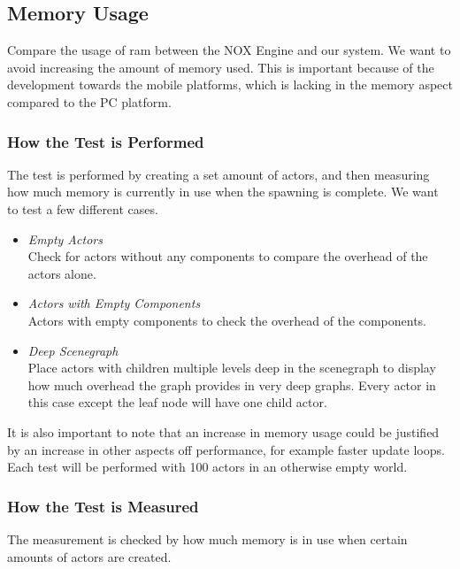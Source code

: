 \subsection{Memory Usage}
Compare the usage of ram between the NOX Engine and our system.
We want to avoid increasing the amount of memory used.
This is important because of the development towards the mobile platforms, which is lacking in the memory aspect compared to the PC platform.

\subsubsection*{How the Test is Performed}
The test is performed by creating a set amount of actors, and then measuring how much memory is currently in use when the spawning is complete.
We want to test a few different cases.

\begin{itemize}

    \item\noindent\textit{Empty Actors}\\
    Check for actors without any components to compare the overhead of the actors alone.

    \item\noindent\textit{Actors with Empty Components}\\
    Actors with empty components to check the overhead of the components.

    \item\noindent\textit{Deep Scenegraph}\\
    Place actors with children multiple levels deep in the scenegraph to display how much overhead the graph provides in very deep graphs.
    Every actor in this case except the leaf node will have one child actor.


\end{itemize}

\noindent It is also important to note that an increase in memory usage could be justified by an increase in other aspects off performance, for example faster update loops.
Each test will be performed with 100 actors in an otherwise empty world.

\subsubsection*{How the Test is Measured}
The measurement is checked by how much memory is in use when certain amounts of actors are created.
